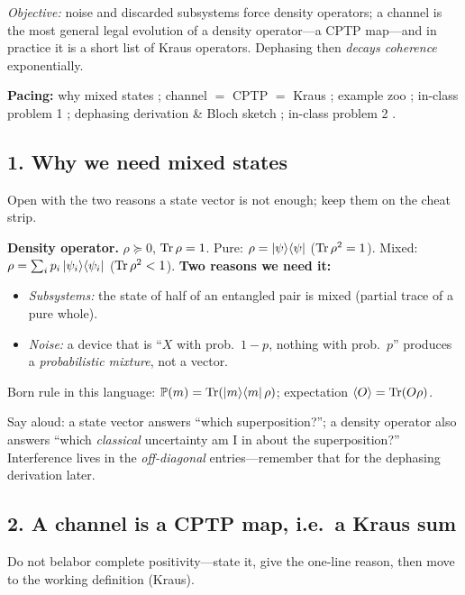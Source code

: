 \documentclass[11pt]{article}
\begin{document}
\noindent\emph{Objective:} noise and discarded subsystems force density operators;
a channel is the most general legal evolution of a density operator---a CPTP map---and
in practice it is a short list of Kraus operators. Dephasing then \emph{decays
coherence} exponentially.

\medskip
\noindent\textbf{Pacing:} why mixed states ; channel $=$ CPTP $=$ Kraus
; example zoo ; in-class problem 1 ; dephasing
derivation \& Bloch sketch ; in-class problem 2 .

\subsection*{1. Why we need mixed states }
Open with the two reasons a state vector is not enough; keep them on the cheat strip.

\begin{board}
\textbf{Density operator.} $\rho\succeq0$, $\operatorname{Tr}\rho=1$. Pure: $\rho=\ket{\psi}\!\bra{\psi}$
($\operatorname{Tr}\rho^2=1$). Mixed: $\rho=\sum_i p_i\ket{\psi_i}\!\bra{\psi_i}$ ($\operatorname{Tr}\rho^2<1$).
\textbf{Two reasons we need it:}
\begin{itemize}
\item[(i)] \emph{Subsystems:} the state of half of an entangled pair is mixed
(partial trace of a pure whole).
\item[(ii)] \emph{Noise:} a device that is ``$X$ with prob.\ $1-p$, nothing with
prob.\ $p$'' produces a \emph{probabilistic mixture}, not a vector.
\end{itemize}
Born rule in this language: $\mathbb{P}(m)=\operatorname{Tr}(\ket{m}\!\bra{m}\rho)$; expectation
$\langle O\rangle=\operatorname{Tr}(O\rho)$.
\end{board}

Say aloud: a state vector answers ``which superposition?''; a density operator also
answers ``which \emph{classical} uncertainty am I in about the superposition?''
Interference lives in the \emph{off-diagonal} entries---remember that for the
dephasing derivation later.

\subsection*{2. A channel is a CPTP map, i.e.\ a Kraus sum }
Do not belabor complete positivity---state it, give the one-line reason, then move to
the working definition (Kraus).
\end{document}
